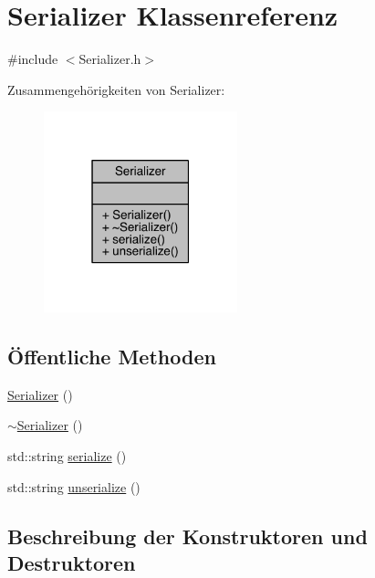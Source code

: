 \hypertarget{class_serializer}{}\section{Serializer Klassenreferenz}
\label{class_serializer}


{\ttfamily \#include $<$Serializer.\+h$>$}



Zusammengehörigkeiten von Serializer\+:
\nopagebreak
\begin{figure}[H]
\begin{center}
\leavevmode
\includegraphics[width=159pt]{class_serializer__coll__graph}
\end{center}
\end{figure}
\subsection*{Öffentliche Methoden}
\begin{DoxyCompactItemize}
\item 
\hyperlink{class_serializer_a9fe7f31924098f75278d059f8443fd5b}{Serializer} ()
\item 
\hyperlink{class_serializer_a42a7d2d8e622ad1ef5f869813b498aa9}{$\sim$\+Serializer} ()
\item 
std\+::string \hyperlink{class_serializer_a76490c3d7c31f10cd2c991731fd54ac5}{serialize} ()
\item 
std\+::string \hyperlink{class_serializer_a55d2d0ca552d5a14b316bab0d8f1590a}{unserialize} ()
\end{DoxyCompactItemize}


\subsection{Beschreibung der Konstruktoren und Destruktoren}
\hypertarget{class_serializer_a9fe7f31924098f75278d059f8443fd5b}{}\label{class_serializer_a9fe7f31924098f75278d059f8443fd5b} 
